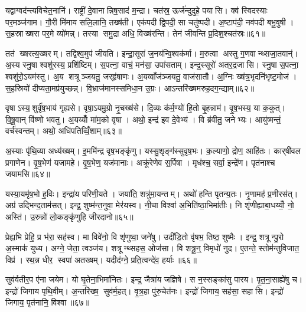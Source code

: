 यद्वाग्वद॑न्त्यविचेत॒नानि॑। राष्ट्री॑ दे॒वानान्निष॒साद॑ म॒न्द्रा। चत॑स्र॒ ऊर्ज॑न्दुदुहे॒ पयासि। क्व॑ स्विदस्याः पर॒मञ्ज॑गाम। गौ॒री मि॑माय सलि॒लानि॒ तख्ष॑ती। एक॑पदी द्वि॒पदी॒ सा चतु॑ष्पदी। अ॒ष्टाप॑दी॒ नव॑पदी बभू॒वुषी। स॒हस्राख्षरा पर॒मे व्यो॑मन्न्। तस्या समु॒द्रा अधि॒ विख्ष॑रन्ति। तेन॑ जीवन्ति प्र॒दिश॒श्चत॑स्रः॥६१॥

तत॑ ख्षरत्य॒ख्षरम्। तद्विश्व॒मुप॑ जीवति। इन्द्रा॒सूरा॑ ज॒नय॑न्वि॒श्वक॑र्मा। म॒रुत्वा अस्तु ग॒णवान्थ्सजा॒तवान्॑। अ॒स्य स्नु॒षा श्वशु॑रस्य॒ प्रशि॑ष्टिम्। स॒पत्ना॒ वाचं॒ मन॑सा॒ उपा॑सताम्। इन्द्र॒स्सूरो॑ अतर॒द्रजासि। स्नु॒षा स॒पत्ना॒ श्वशु॑रो॒ऽयम॑स्तु। अ॒य शत्रूञ्जयतु॒ जर्‌हृ॑षाणः। अ॒यव्वाँज॑ञ्जयतु॒ वाज॑सातौ। अ॒ग्निः ख्ष॑त्र॒भृदनि॑भृष्ट॒मोज॑। स॒ह॒स्रियो॑ दीप्यता॒मप्र॑युच्छन्न्। वि॒भ्राज॑मानस्समिधा॒न उ॒ग्रः। आऽन्तरि॑ख्षमरुह॒दग॒न्द्याम्॥६२॥\anuvakamend[धा॒रय॑न्पुरो॒डाशं॒ बृह॒स्पति॑ञ्ज॒घन॑च्युतिमान॒न्दो भग॑स्य तृप्याण्य॒ग्नेः पृ॑थि॒वी यज्व॑न एतु प्र॒दिश॒श्चत॑स्रो॒ वाज॑सातौ च॒त्वारि॑ च]

वृषाऽस्य॒शुर्वृ॑ष॒भाय॑ गृह्यसे। वृषा॒ऽयमु॒ग्रो नृ॒चख्ष॑से। दि॒व्यः क॑र्म॒ण्यो॑ हि॒तो बृ॒हन्नाम॑। वृ॒ष॒भस्य॒ या क॒कुत्। वि॒षू॒वान् वि॑ष्णो भवतु। अ॒यय्योँ मा॑म॒को वृषा। अथो॒ इन्द्र॑ इव दे॒वेभ्य॑। वि ब्र॑वीतु॒ जनेभ्यः। आयु॑ष्मन्तं॒ वर्च॑स्वन्तम्। अथो॒ अधि॑पतिव्विँ॒शाम्॥६३॥

अ॒स्याः पृ॑थि॒व्या अध्य॑ख्षम्। इ॒ममि॑न्द्र वृष॒भङ्कृ॑णु। यस्सु॒शृङ्ग॑स्सुवृष॒भः। क॒ल्याणो॒ द्रोण॒ आहि॑तः। कार्‌षी॑वल प्रगाणेन। वृ॒ष॒भेण॑ यजामहे। वृ॒ष॒भेण॒ यज॑मानाः। अक्रू॑रेणेव स॒र्पिषा। मृध॑श्च॒ सर्वा॒ इन्द्रे॑ण। पृत॑नाश्च जयामसि॥६४॥

यस्या॒यमृ॑ष॒भो ह॒विः। इन्द्रा॑य परिणी॒यते। जया॑ति॒ शत्रु॑मा॒यन्तम्। अथो॑ हन्ति पृतन्य॒तः। नृ॒णामह॑ प्र॒णीरस॑त्। अग्र॑ उद्भिन्द॒ताम॑सत्। इन्द्र॒ शुष्म॑न्त॒नुवा॒ मेर॑यस्व। नी॒चा विश्वा॑ अ॒भिति॑ष्ठा॒भिमा॑तीः। नि शृ॑णीह्याबा॒धय्योँ॒ नो॒ अस्ति॑। उ॒रुन्नो॑ लो॒कङ्कृ॑णुहि जीरदानो॥६५॥

प्रेह्य॒भि प्रेहि॒ प्र भ॑रा॒ सह॑स्व। मा विवे॑नो॒ वि शृ॑णुष्वा॒ जने॑षु। उदी॑डि॒तो वृ॑षभ॒ तिष्ठ॒ शुष्मैः। इन्द्र॒ शत्रून्पु॒रो अ॒स्माक॑ युध्य। अग्ने॒ जेता॒ त्वञ्ज॑य। शत्रून्थ्सहस॒ ओज॑सा। वि शत्रू॒न्॒ विमृधो॑ नुद। ए॒तन्ते॒ स्तोम॑न्तुविजात॒ विप्र॑। रथ॒न्न धीर॒ स्वपा॑ अतख्षम्। यदीद॑ग्ने॒ प्रति॒त्वन्दे॑व॒ हर्याः॥६६॥

सुव॑र्वतीर॒प ए॑ना जयेम। यो घृ॒तेना॒भिमा॑नितः। इन्द्र॒ जैत्रा॑य जज्ञिषे। स न॒स्सङ्का॑सु पारय। पृ॒त॒ना॒साह्ये॑षु च। इन्द्रो॑ जिगाय पृथि॒वीम्। अ॒न्तरि॑ख्ष॒ सुव॑र्म॒हत्। वृ॒त्र॒हा पु॑रु॒चेत॑नः। इन्द्रो॑ जिगाय॒ सह॑सा॒ सहासि। इन्द्रो॑ जिगाय॒ पृत॑नानि॒ विश्वा॥६७॥

